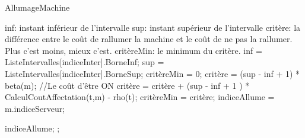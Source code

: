 \begin{algorithm}[H]
\caption{AllumageMachine}
\label{algo7}
\begin{algorithmic}[1]
\LOOP
	\STATE inf: instant inférieur de l'intervalle
	\STATE sup: instant supérieur de l'intervalle
	\STATE critère: la différence entre le coût de rallumer la machine et le coût de ne pas la rallumer. Plus c'est moins, mieux c'est.
	\STATE critèreMin: le minimum du critère.
	\STATE
	\STATE inf = ListeIntervalles[indiceInter].BorneInf;
	\STATE sup = ListeIntervalles[indiceInter].BorneSup;
	\STATE critèreMin = 0;
			\STATE critère = (sup - inf + 1) * beta(m); //Le coût d'être ON
					\STATE critère = critère + (sup - inf + 1 ) * CalculCoutAffectation(t,m) - rho(t);
				\ENDIF
			\ENDFOR
				\STATE critèreMin  = critère;
				\STATE indiceAllume = m.indiceServeur;
			\ENDIF
		\ENDIF
	\ENDFOR
	
		\RETURN indiceAllume;
	\ELSE
		;
	\ENDIF
\ENDLOOP
\end{algorithmic}
\end{algorithm} 